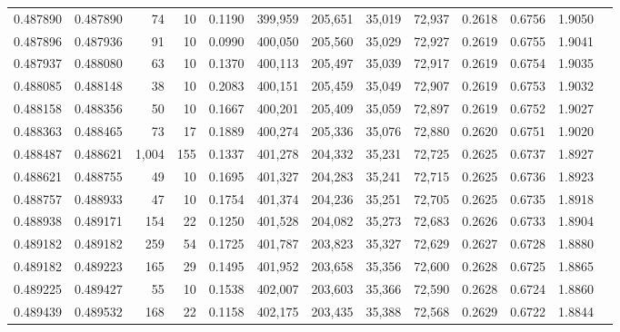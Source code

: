 \begin{tabular}{rrrrrrrrrrrrr}
0.487890 & 0.487890 &    74 &  10 &                                     0.1190 & 399,959 & 205,651 &  35,019 &  72,937 & 0.2618 & 0.6756 & 1.9050 \\
0.487896 & 0.487936 &    91 &  10 &                                     0.0990 & 400,050 & 205,560 &  35,029 &  72,927 & 0.2619 & 0.6755 & 1.9041 \\
0.487937 & 0.488080 &    63 &  10 &                                     0.1370 & 400,113 & 205,497 &  35,039 &  72,917 & 0.2619 & 0.6754 & 1.9035 \\
0.488085 & 0.488148 &    38 &  10 &                                     0.2083 & 400,151 & 205,459 &  35,049 &  72,907 & 0.2619 & 0.6753 & 1.9032 \\
0.488158 & 0.488356 &    50 &  10 &                                     0.1667 & 400,201 & 205,409 &  35,059 &  72,897 & 0.2619 & 0.6752 & 1.9027 \\
0.488363 & 0.488465 &    73 &  17 &                                     0.1889 & 400,274 & 205,336 &  35,076 &  72,880 & 0.2620 & 0.6751 & 1.9020 \\
0.488487 & 0.488621 & 1,004 & 155 &                                     0.1337 & 401,278 & 204,332 &  35,231 &  72,725 & 0.2625 & 0.6737 & 1.8927 \\
0.488621 & 0.488755 &    49 &  10 &                                     0.1695 & 401,327 & 204,283 &  35,241 &  72,715 & 0.2625 & 0.6736 & 1.8923 \\
0.488757 & 0.488933 &    47 &  10 &                                     0.1754 & 401,374 & 204,236 &  35,251 &  72,705 & 0.2625 & 0.6735 & 1.8918 \\
0.488938 & 0.489171 &   154 &  22 &                                     0.1250 & 401,528 & 204,082 &  35,273 &  72,683 & 0.2626 & 0.6733 & 1.8904 \\
0.489182 & 0.489182 &   259 &  54 &                                     0.1725 & 401,787 & 203,823 &  35,327 &  72,629 & 0.2627 & 0.6728 & 1.8880 \\
0.489182 & 0.489223 &   165 &  29 &                                     0.1495 & 401,952 & 203,658 &  35,356 &  72,600 & 0.2628 & 0.6725 & 1.8865 \\
0.489225 & 0.489427 &    55 &  10 &                                     0.1538 & 402,007 & 203,603 &  35,366 &  72,590 & 0.2628 & 0.6724 & 1.8860 \\
0.489439 & 0.489532 &   168 &  22 &                                     0.1158 & 402,175 & 203,435 &  35,388 &  72,568 & 0.2629 & 0.6722 & 1.8844 \\

\end{tabular}
